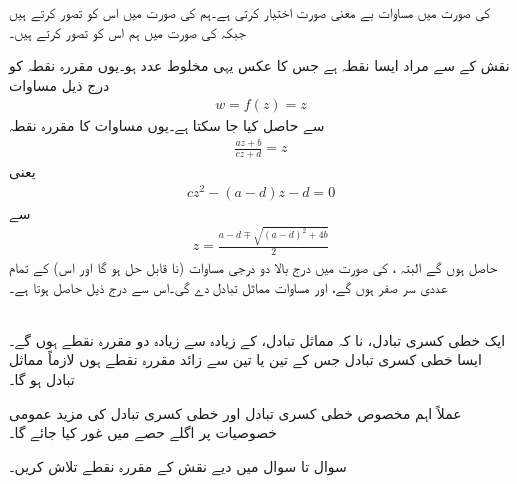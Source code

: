   کی صورت میں مساوات  بے معنی صورت  اختیار کرتی ہے۔ہم  کی صورت میں اس کو  تصور کرتے ہیں جبکہ  کی صورت میں ہم اس کو  تصور کرتے ہیں۔

 نقش  کے  سے مراد ایسا نقطہ ہے جس کا عکس یہی مخلوط عدد ہو۔یوں مقررہ نقطہ کو درج ذیل مساوات 
\begin{align*}
w=f(z)=z
\end{align*}
سے حاصل کیا جا سکتا ہے۔یوں مساوات  کا مقررہ نقطہ
\begin{align*}
\frac{az+b}{cz+d}=z
\end{align*}
یعنی
\begin{align}\label{مساوات_نقش_دو_درجی_الف}
cz^2-(a-d)z-d=0
\end{align}
سے
\begin{align*}
z=\frac{a-d\mp\sqrt{(a-d)^2+4b}}{2}
\end{align*}
 حاصل ہوں گے البتہ ،  کی صورت میں درج بالا دو درجی مساوات (نا قابل حل ہو گا اور اس) کے تمام عددی سر صفر ہوں گے، اور مساوات   مماثل تبادل  دے  گی۔اس سے درج ذیل حاصل ہوتا ہے۔

\quad {}\\
ایک خطی کسری تبادل، نا کہ مماثل تبادل، کے زیادہ سے زیادہ دو  مقررہ نقطے ہوں گے۔ایسا خطی کسری تبادل جس کے تین یا تین سے زائد مقررہ نقطے ہوں لازماً مماثل تبادل ہو گا۔

عملاً اہم مخصوص خطی کسری تبادل اور خطی کسری تبادل کی مزید عمومی خصوصیات پر اگلے حصے میں غور کیا جائے گا۔

سوال  تا سوال  میں دیے نقش کے مقررہ نقطے تلاش کریں۔

